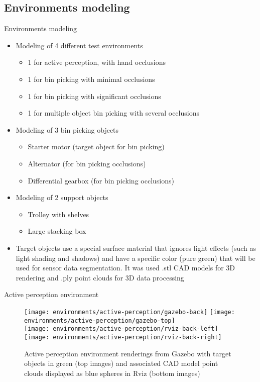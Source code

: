\subsection*{Environments modeling}
\begin{frame}{Environments modeling}
	\begin{itemize}
		\item Modeling of 4 different test environments
			\begin{itemize}
				\item 1 for active perception, with hand occlusions
				\item 1 for bin picking with minimal occlusions
				\item 1 for bin picking with significant occlusions
				\item 1 for multiple object bin picking with several occlusions
			\end{itemize}
		\item Modeling of 3 bin picking objects
		\begin{itemize}
			\item Starter motor (target object for bin picking)
			\item Alternator (for bin picking occlusions)
			\item Differential gearbox (for bin picking occlusions)
		\end{itemize}
		\item Modeling of 2 support objects
		\begin{itemize}
			\item Trolley with shelves
			\item Large stacking box
		\end{itemize}
		\item Target objects use a special surface material that ignores light effects (such as light shading and shadows) and have a specific color (pure green) that will be used for sensor data segmentation. It was used .stl CAD models for 3D rendering and .ply point clouds for 3D data processing
	\end{itemize}
\end{frame}


\begin{frame}{Active perception environment}
	\begin{figure}
		\centering
		\texttt{[image: environments/active-perception/gazebo-back]}
		\texttt{[image: environments/active-perception/gazebo-top]}\\
		\texttt{[image: environments/active-perception/rviz-back-left]}
		\texttt{[image: environments/active-perception/rviz-back-right]}
		\caption{Active perception environment renderings from Gazebo with target objects in green (top images) and associated CAD model point clouds displayed as blue spheres in Rviz (bottom images)}
	\end{figure}
\end{frame}


